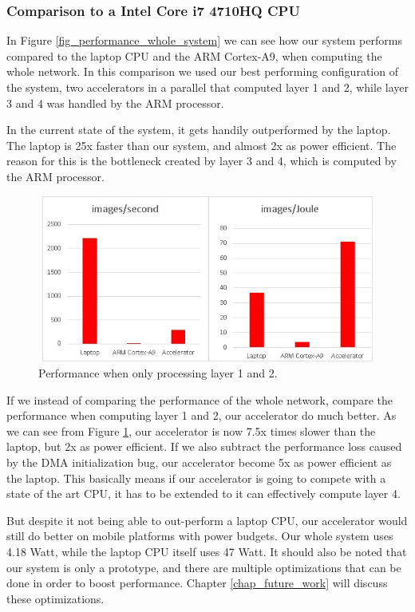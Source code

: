 \subsubsection{Comparison to a Intel Core i7 4710HQ CPU}

In Figure \ref{fig_performance_whole_system} we can see how our system performs compared to the laptop CPU and the ARM Cortex-A9, when computing the whole network. In this comparison we used our best performing configuration of the system, two accelerators in a parallel that computed layer 1 and 2, while layer 3 and 4 was handled by the ARM processor.

In the current state of the system, it gets handily outperformed by the laptop. The laptop is 25x faster than our system, and almost 2x as power efficient. The reason for this is the bottleneck created by layer 3 and 4, which is computed by the ARM processor.

\begin{figure}[h!]
	\centering
	\includegraphics[width=1.0\textwidth,height=5.5cm]{Figures/Results/performance_C1C2_laptop}
	\caption{Performance when only processing layer 1 and 2.}
	\label{fig_performance_C1C2_laptop}
\end{figure}


If we instead of comparing the performance of the whole network, compare the performance when computing layer 1 and 2, our accelerator do much better. As we can see from Figure \ref{fig_performance_C1C2_laptop}, our accelerator is now 7.5x times slower than the laptop, but 2x as power efficient. If we also subtract the performance loss caused by the DMA initialization bug, our accelerator become 5x as power efficient as the laptop. This basically means if our accelerator is going to compete with a state of the art CPU, it has to be extended to it can effectively compute layer 4.  

But despite it not being able to out-perform a laptop CPU, our accelerator would still do better on mobile platforms with power budgets. Our whole system uses 4.18 Watt, while the laptop CPU itself uses 47 Watt. It should also be noted that our system is only a prototype, and there are multiple optimizations that can be done in order to boost performance. Chapter \ref{chap_future_work} will discuss these optimizations.
